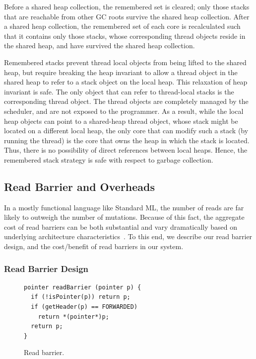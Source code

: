 Before a shared heap collection, the remembered set is cleared; only those
stacks that are reachable from other GC roots survive the shared heap
collection. After a shared heap collection, the remembered set of each core is
recalculated such that it contains only those stacks, whose corresponding
thread objects reside in the shared heap, and have survived the shared heap
collection.

Remembered stacks prevent thread local objects from being lifted to the shared
heap, but require breaking the heap invariant to allow a thread object in the
shared heap to refer to a stack object on the local heap. This relaxation of
heap invariant is safe. The only object that can refer to thread-local stacks
is the corresponding thread object. The thread objects are completely managed
by the scheduler, and are not exposed to the programmer. As a result, while the
local heap objects can point to a shared-heap thread object, whose stack might
be located on a different local heap, the only core that can modify such a
stack (by running the thread) is the core that owns the heap in which the stack
is located. Thus, there is no possibility of direct references between local
heaps. Hence, the remembered stack strategy is safe with respect to garbage
collection.

\subsection{Read Barrier and Overheads}

In a mostly functional language like Standard ML, the number of reads are far
likely to outweigh the number of mutations. Because of this fact, the aggregate
cost of read barriers can be both substantial and vary dramatically based on
underlying architecture characteristics~\cite{Blackburn04}. To this end, we
describe our read barrier design, and the cost/benefit of read barriers in our
system.

\subsubsection{Read Barrier Design}

\begin{figure}[t]
\begin{lstlisting}
pointer readBarrier (pointer p) {
  if (!isPointer(p)) return p;
  if (getHeader(p) == FORWARDED)
    return *(pointer*)p;
  return p;
}
\end{lstlisting}
\caption{Read barrier.}
\label{code:read_barrier}
\end{figure}

